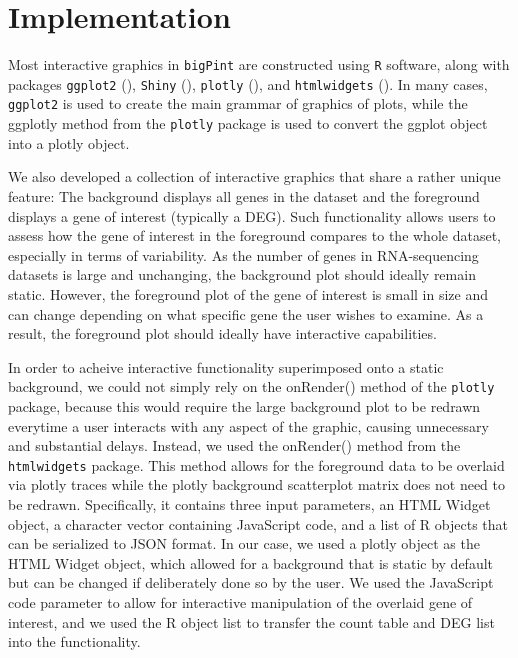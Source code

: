 \documentclass[11pt,a4paper,oldfontcommands,openany]{memoir}
\numberwithin{equation}{section} %
\newcommand{\pkg}[1]{{\texttt{#1}}}
\begin{document}
\section{Implementation}

Most interactive graphics in \pkg{bigPint} are constructed using \pkg{R} \citep{R} software, along with packages \pkg{ggplot2} (\citealt{ggplot2}), \pkg{Shiny} (\citealt{shiny}), \pkg{plotly} (\citealt{plotly}), and \pkg{htmlwidgets} (\citealt{htmlwidgets}). In many cases, \pkg{ggplot2} is used to create the main grammar of graphics of plots, while the ggplotly method from the \pkg{plotly} package is used to convert the ggplot object into a plotly object.

We also developed a collection of interactive graphics that share a rather unique feature: The background displays all genes in the dataset and the foreground displays a gene of interest (typically a DEG). Such functionality allows users to assess how the gene of interest in the foreground compares to the whole dataset, especially in terms of variability. As the number of genes in RNA-sequencing datasets is large and unchanging, the background plot should ideally remain static. However, the foreground plot of the gene of interest is small in size and can change depending on what specific gene the user wishes to examine. As a result, the foreground plot should ideally have interactive capabilities.
 
In order to acheive interactive functionality superimposed onto a static background, we could not simply rely on the onRender() method of the \pkg{plotly} package, because this would require the large background plot to be redrawn everytime a user interacts with any aspect of the graphic, causing unnecessary and substantial delays. Instead, we used the onRender() method from the \pkg{htmlwidgets} package. This method allows for the foreground data to be overlaid via plotly traces while the plotly background scatterplot matrix does not need to be redrawn. Specifically, it contains three input parameters, an HTML Widget object, a character vector containing JavaScript code, and a list of R objects that can be serialized to JSON format. In our case, we used a plotly object as the HTML Widget object, which allowed for a background that is static by default but can be changed if deliberately done so by the user. We used the JavaScript code parameter to allow for interactive manipulation of the overlaid gene of interest, and we used the R object list to transfer the count table and DEG list into the functionality.
\end{document}

